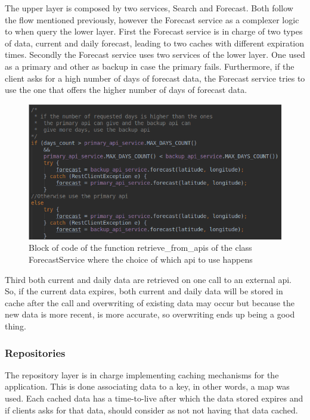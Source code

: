 \documentclass[12pt]{article}
\begin{document}
The upper layer is composed by two services, Search and Forecast. Both follow the flow mentioned
  previously, however the Forecast service as a complexer logic to when query the lower layer. First
  the Forecast service is in charge of two types of data, current and daily forecast, leading to
  two caches with different expiration times. Secondly the Forecast service uses two services
  of the lower layer. One used as a primary and other as backup in case the primary fails. Furthermore,
  if the client asks for a high number of days of forecast data, the Forecast service tries to use the
  one that offers the higher number of days of forecast data.

\begin{figure}[h]
  \center
  \includegraphics[scale=0.5]{primary_backup_apis.png}
  \caption{Block of code of the function retrieve\_from\_apis of the class ForecastService where
    the choice of which api to use happens}
\end{figure}

  Third both current and daily data are retrieved on one call to an external api. So, if the
  current data expires, both current and daily data will be stored in cache after the call
  and overwriting of existing data may occur but because the new data is more recent, is more
  accurate, so overwriting ends up being a good thing.

\subsubsection{Repositories}

The repository layer is in charge implementing caching mechanisms for the application. This is done
  associating data to a key, in other words, a map was used. Each cached data has a time-to-live
  after which the data stored expires and if clients asks for that data, should consider as not
  not having that data cached.
\end{document}
